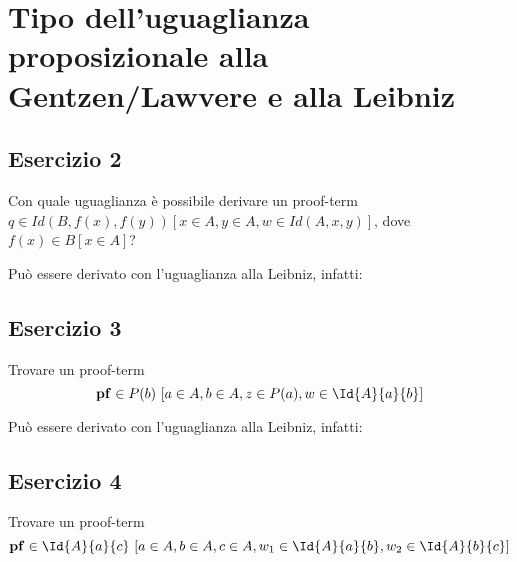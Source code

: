 \newpage
\section{Tipo dell'uguaglianza proposizionale alla Gentzen/Lawvere e alla Leibniz}
\subsection{Esercizio 2}
\begin{thm}
	Con quale uguaglianza è possibile derivare un proof-term $q\in Id(B, f(x), f(y)) [x\in A, y\in A, w\in Id(A, x, y)]$, dove $f(x)\in B[x\in A]$?
\end{thm}
Può essere derivato con l'uguaglianza alla Leibniz, infatti:



\subsection{Esercizio 3}
\begin{thm}\label{thm:ug3} Trovare un proof-term
	\[ \mathbf{pf}\in P(b)\ [a\in A, b\in A, z\in P(a), w\in \Id{A}{a}{b}]\]
\end{thm}
Può essere derivato con l'uguaglianza alla Leibniz, infatti:


%

\subsection{Esercizio 4}
\begin{thm}
	Trovare un proof-term
	\[ \mathbf{pf} \in \Id{A}{a}{c}\ [a\in A, b\in A, c\in A, w_1 \in \Id{A}{a}{b}, w_2 \in \Id{A}{b}{c} ] \]
\end{thm}

